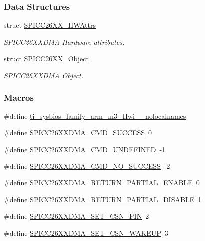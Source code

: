 \subsubsection*{Data Structures}
\begin{DoxyCompactItemize}
\item 
struct \hyperlink{struct_s_p_i_c_c26_x_x___h_w_attrs}{S\-P\-I\-C\-C26\-X\-X\-\_\-\-H\-W\-Attrs}
\begin{DoxyCompactList}\small\item\em S\-P\-I\-C\-C26\-X\-X\-D\-M\-A Hardware attributes. \end{DoxyCompactList}\item 
struct \hyperlink{struct_s_p_i_c_c26_x_x___object}{S\-P\-I\-C\-C26\-X\-X\-\_\-\-Object}
\begin{DoxyCompactList}\small\item\em S\-P\-I\-C\-C26\-X\-X\-D\-M\-A Object. \end{DoxyCompactList}\end{DoxyCompactItemize}
\subsubsection*{Macros}
\begin{DoxyCompactItemize}
\item 
\#define \hyperlink{_s_p_i_c_c26_x_x_d_m_a_8h_aaa17ecf48f5762e2e1bdb0bab8aacf0c}{ti\-\_\-sysbios\-\_\-family\-\_\-arm\-\_\-m3\-\_\-\-Hwi\-\_\-\-\_\-nolocalnames}
\item 
\#define \hyperlink{_s_p_i_c_c26_x_x_d_m_a_8h_aa7f5cc2f2229311a915e63b0c7d8b9f2}{S\-P\-I\-C\-C26\-X\-X\-D\-M\-A\-\_\-\-C\-M\-D\-\_\-\-S\-U\-C\-C\-E\-S\-S}~0
\item 
\#define \hyperlink{_s_p_i_c_c26_x_x_d_m_a_8h_a95f7f3325e4268d5ea76fc861b7eb043}{S\-P\-I\-C\-C26\-X\-X\-D\-M\-A\-\_\-\-C\-M\-D\-\_\-\-U\-N\-D\-E\-F\-I\-N\-E\-D}~-\/1
\item 
\#define \hyperlink{_s_p_i_c_c26_x_x_d_m_a_8h_ade8c0201661e60db6ff7ea0b183f6338}{S\-P\-I\-C\-C26\-X\-X\-D\-M\-A\-\_\-\-C\-M\-D\-\_\-\-N\-O\-\_\-\-S\-U\-C\-C\-E\-S\-S}~-\/2
\item 
\#define \hyperlink{_s_p_i_c_c26_x_x_d_m_a_8h_a5d2c909f70c7093227d1b288354cef27}{S\-P\-I\-C\-C26\-X\-X\-D\-M\-A\-\_\-\-R\-E\-T\-U\-R\-N\-\_\-\-P\-A\-R\-T\-I\-A\-L\-\_\-\-E\-N\-A\-B\-L\-E}~0
\item 
\#define \hyperlink{_s_p_i_c_c26_x_x_d_m_a_8h_a6454ac0d2222d98114cf15a4a60367ca}{S\-P\-I\-C\-C26\-X\-X\-D\-M\-A\-\_\-\-R\-E\-T\-U\-R\-N\-\_\-\-P\-A\-R\-T\-I\-A\-L\-\_\-\-D\-I\-S\-A\-B\-L\-E}~1
\item 
\#define \hyperlink{_s_p_i_c_c26_x_x_d_m_a_8h_a447172f0061a6de65a8f0d221a23f93c}{S\-P\-I\-C\-C26\-X\-X\-D\-M\-A\-\_\-\-S\-E\-T\-\_\-\-C\-S\-N\-\_\-\-P\-I\-N}~2
\item 
\#define \hyperlink{_s_p_i_c_c26_x_x_d_m_a_8h_a55b298e59379bdd6020f8d55bb4264a9}{S\-P\-I\-C\-C26\-X\-X\-D\-M\-A\-\_\-\-S\-E\-T\-\_\-\-C\-S\-N\-\_\-\-W\-A\-K\-E\-U\-P}~3
\end{DoxyCompactItemize}
